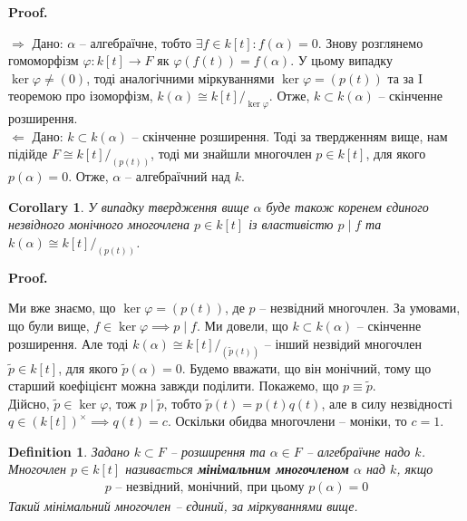 \documentclass[a4paper, 10pt]{article}
\makeatletter
\def\rightproof{$\boxed{\Rightarrow}$ }
\def\leftproof{$\boxed{\Leftarrow}$ }
\theoremstyle{theoremdd}
\theoremstyle{theoremdd}
\newtheorem{definition}[theorem]{Definition}
\theoremstyle{theoremdd}
\theoremstyle{theoremdd}
\theoremstyle{theoremdd}
\theoremstyle{theoremdd}
\theoremstyle{theoremdd}
\theoremstyle{theoremdd}
\theoremstyle{theoremdd}
\theoremstyle{theoremdd}
\theoremstyle{theoremdd}
\theoremstyle{theoremdd}
\theoremstyle{theoremdd}
\theoremstyle{theoremdd}
\newtheorem{corollary}[theorem]{Corollary}
\theoremstyle{theoremdd}
\renewenvironment{proof}[1][Proof.\\]{\par
\pushQED{\hfill \qed}%
\normalfont \topsep6\p@\@plus6\p@\relax
\trivlist
\item\relax
{\bfseries
#1\@addpunct{.}}\hspace\labelsep\ignorespaces
}{%
\popQED\endtrivlist\@endpefalse
}
\makeatother
\begin{document}
\begin{proof}
\rightproof Дано: $\alpha$ -- алгебраїчне, тобто $\exists f \in k[t]: f(\alpha) = 0$. Знову розглянемо гомоморфізм $\varphi \colon k[t] \to F$ як $\varphi(f(t))  = f(\alpha)$. У цьому випадку $\ker \varphi \neq (0)$, тоді аналогічними міркуваннями $\ker \varphi = (p(t))$ та за I теоремою про ізоморфізм, $k(\alpha) \cong k[t]/_{\ker \varphi}$. Отже, $k \subset k(\alpha)$ -- скінченне розширення.
\bigskip \\
\leftproof Дано: $k \subset k(\alpha)$ -- скінченне розширення. Тоді за твердженням вище, нам підійде $F \cong k[t]/_{(p(t))}$, тоді ми знайшли многочлен $p \in k[t]$, для якого $p(\alpha) = 0$. Отже, $\alpha$ -- алгебраїчний над $k$.
\end{proof}

\begin{corollary}
У випадку твердження вище $\alpha$ буде також коренем єдиного незвідного монічного многочлена $p \in k[t]$ із властивістю $p \mid f$ та $k(\alpha) \cong k[t]/_{(p(t))}$.
\end{corollary}

\begin{proof}
Ми вже знаємо, що $\ker \varphi = (p(t))$, де $p$ -- незвідний многочлен. За умовами, що були вище, $f \in \ker \varphi \implies p \mid f$. Ми довели, що $k \subset k(\alpha)$ -- скінченне розширення. Але тоді $k(\alpha) \cong k[t]/_{(\tilde{p}(t))}$ -- інший незвідий многочлен $\tilde{p} \in k[t]$, для якого $\tilde{p}(\alpha) = 0$. Будемо вважати, що він монічний, тому що старший коефіцієнт можна завжди поділити. Покажемо, що $p \equiv \tilde{p}$.\\
Дійсно, $\tilde{p} \in \ker \varphi$, тож $p \mid \tilde{p}$, тобто $\tilde{p}(t) = p(t) q(t)$, але в силу незвідності $q \in (k[t])^\times \implies q(t) = c$. Оскільки обидва многочлени -- моніки, то $c = 1$.
\end{proof}

\begin{definition}
Задано $k \subset F$ -- розширення та $\alpha \in F$ -- алгебраїчне надо $k$.\\
Многочлен $p \in k[t]$ називається \textbf{мінімальним многочленом} $\alpha$ над $k$, якщо
\begin{align*}
p \text{ -- незвідний, монічний, при цьому } p(\alpha) = 0
\end{align*}
Такий мінімальний многочлен -- єдиний, за міркуваннями вище.
\end{definition}
\end{document}
